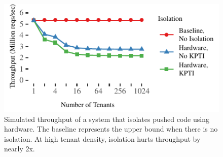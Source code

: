 \begin{figure}[t]
\includegraphics[width=\textwidth]{graphs/simulator.pdf}
\caption{Simulated throughput of a system that isolates pushed
code using hardware. The baseline represents the upper bound when there
is no isolation. At high tenant density, isolation hurts throughput by
nearly 2x.}
\label{fig:context-switches}
\end{figure}
